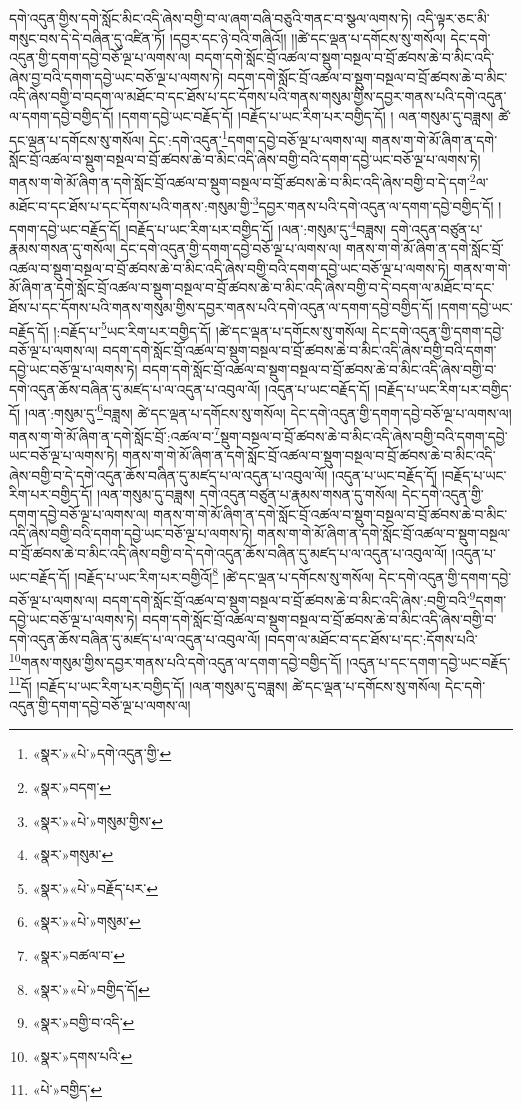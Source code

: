 དགེ་འདུན་གྱིས་དགེ་སློང་མིང་འདི་ཞེས་བགྱི་བ་ལ་ཞག་བཞི་བཅུའི་གནང་བ་སྩལ་ལགས་ཏེ། འདི་ལྟར་ཅང་མི་གསུང་བས་དེ་དེ་བཞིན་དུ་འཛིན་ཏོ། །དབྱར་དང་ཉེ་བའི་གཞིའོ།། །།ཚེ་དང་ལྡན་པ་དགོངས་སུ་གསོལ། དེང་དགེ་འདུན་གྱི་དགག་དབྱེ་བཅོ་ལྔ་པ་ལགས་ལ། བདག་དགེ་སློང་བྲོ་འཚལ་བ་སྡུག་བསྔལ་བ་བྲོ་ཚབས་ཆེ་བ་མིང་འདི་ཞེས་བྱ་བའི་དགག་དབྱེ་ཡང་བཅོ་ལྔ་པ་ལགས་ཏེ། བདག་དགེ་སློང་བྲོ་འཚལ་བ་སྡུག་བསྔལ་བ་བྲོ་ཚབས་ཆེ་བ་མིང་འདི་ཞེས་བགྱི་བ་བདག་ལ་མཐོང་བ་དང་ཐོས་པ་དང་དོགས་པའི་གནས་གསུམ་གྱིས་དབྱར་གནས་པའི་དགེ་འདུན་ལ་དགག་དབྱེ་བགྱིད་དོ། །དགག་དབྱེ་ཡང་བརྗོད་དོ། །བརྗོད་པ་ཡང་རིག་པར་བགྱིད་དོ། །
ལན་གསུམ་དུ་བཟླས། ཚེ་དང་ལྡན་པ་དགོངས་སུ་གསོལ། དེང་:དགེ་འདུན་\footnote{«སྣར་»«པེ་»དགེ་འདུན་གྱི་}དགག་དབྱེ་བཅོ་ལྔ་པ་ལགས་ལ། གནས་ག་གེ་མོ་ཞིག་ན་དགེ་སློང་བྲོ་འཚལ་བ་སྡུག་བསྔལ་བ་བྲོ་ཚབས་ཆེ་བ་མིང་འདི་ཞེས་བགྱི་བའི་དགག་དབྱེ་ཡང་བཅོ་ལྔ་པ་ལགས་ཏེ། གནས་ག་གེ་མོ་ཞིག་ན་དགེ་སློང་བྲོ་འཚལ་བ་སྡུག་བསྔལ་བ་བྲོ་ཚབས་ཆེ་བ་མིང་འདི་ཞེས་བགྱི་བ་དེ་དག་\footnote{«སྣར་»བདག་}ལ་མཐོང་བ་དང་ཐོས་པ་དང་དོགས་པའི་གནས་:གསུམ་གྱི་\footnote{«སྣར་»«པེ་»གསུམ་གྱིས་}དབྱར་གནས་པའི་དགེ་འདུན་ལ་དགག་དབྱེ་བགྱིད་དོ། །དགག་དབྱེ་ཡང་བརྗོད་དོ། །བརྗོད་པ་ཡང་རིག་པར་བགྱིད་དོ། །ལན་:གསུམ་དུ་\footnote{«སྣར་»གསུམ་}བཟླས། དགེ་འདུན་བཙུན་པ་རྣམས་གསན་དུ་གསོལ། དེང་དགེ་འདུན་གྱི་དགག་དབྱེ་བཅོ་ལྔ་པ་ལགས་ལ། གནས་ག་གེ་མོ་ཞིག་ན་དགེ་སློང་བྲོ་འཚལ་བ་སྡུག་བསྔལ་བ་བྲོ་ཚབས་ཆེ་བ་མིང་འདི་ཞེས་བགྱི་བའི་དགག་དབྱེ་ཡང་བཅོ་ལྔ་པ་ལགས་ཏེ། གནས་ག་གེ་མོ་ཞིག་ན་དགེ་སློང་བྲོ་འཚལ་བ་སྡུག་བསྔལ་བ་བྲོ་ཚབས་ཆེ་བ་མིང་འདི་ཞེས་བགྱི་བ་དེ་བདག་ལ་མཐོང་བ་དང་ཐོས་པ་དང་དོགས་པའི་གནས་གསུམ་གྱིས་དབྱར་གནས་པའི་དགེ་འདུན་ལ་དགག་དབྱེ་བགྱིད་དོ། །དགག་དབྱེ་ཡང་བརྗོད་དོ། །:བརྗོད་པ་\footnote{«སྣར་»«པེ་»བརྗོད་པར་}ཡང་རིག་པར་བགྱིད་དོ། །ཚེ་དང་ལྡན་པ་དགོངས་སུ་གསོལ། དེང་དགེ་འདུན་གྱི་དགག་དབྱེ་བཅོ་ལྔ་པ་ལགས་ལ། བདག་དགེ་སློང་བྲོ་འཚལ་བ་སྡུག་བསྔལ་བ་བྲོ་ཚབས་ཆེ་བ་མིང་འདི་ཞེས་བགྱི་བའི་དགག་དབྱེ་ཡང་བཅོ་ལྔ་པ་ལགས་ཏེ། བདག་དགེ་སློང་བྲོ་འཚལ་བ་སྡུག་བསྔལ་བ་བྲོ་ཚབས་ཆེ་བ་མིང་འདི་ཞེས་བགྱི་བ་དགེ་འདུན་ཆོས་བཞིན་དུ་མཛད་པ་ལ་འདུན་པ་འབུལ་ལོ། །འདུན་པ་ཡང་བརྗོད་དོ། །བརྗོད་པ་ཡང་རིག་པར་བགྱིད་དོ། །ལན་:གསུམ་དུ་\footnote{«སྣར་»«པེ་»གསུམ་}བཟླས། ཚེ་དང་ལྡན་པ་དགོངས་སུ་གསོལ། དེང་དགེ་འདུན་གྱི་དགག་དབྱེ་བཅོ་ལྔ་པ་ལགས་ལ། གནས་ག་གེ་མོ་ཞིག་ན་དགེ་སློང་བྲོ་:འཚལ་བ་\footnote{«སྣར་»བཚལ་བ་}སྡུག་བསྔལ་བ་བྲོ་ཚབས་ཆེ་བ་མིང་འདི་ཞེས་བགྱི་བའི་དགག་དབྱེ་ཡང་བཅོ་ལྔ་པ་ལགས་ཏེ། གནས་ག་གེ་མོ་ཞིག་ན་དགེ་སློང་བྲོ་འཚལ་བ་སྡུག་བསྔལ་བ་བྲོ་ཚབས་ཆེ་བ་མིང་འདི་ཞེས་བགྱི་བ་དེ་དགེ་འདུན་ཆོས་བཞིན་དུ་མཛད་པ་ལ་འདུན་པ་འབུལ་ལོ། །འདུན་པ་ཡང་བརྗོད་དོ། །བརྗོད་པ་ཡང་རིག་པར་བགྱིད་དོ། །ལན་གསུམ་དུ་བཟླས། དགེ་འདུན་བཙུན་པ་རྣམས་གསན་དུ་གསོལ། དེང་དགེ་འདུན་གྱི་དགག་དབྱེ་བཅོ་ལྔ་པ་ལགས་ལ། གནས་ག་གེ་མོ་ཞིག་ན་དགེ་སློང་བྲོ་འཚལ་བ་སྡུག་བསྔལ་བ་བྲོ་ཚབས་ཆེ་བ་མིང་འདི་ཞེས་བགྱི་བའི་དགག་དབྱེ་ཡང་བཅོ་ལྔ་པ་ལགས་ཏེ། གནས་ག་གེ་མོ་ཞིག་ན་དགེ་སློང་བྲོ་འཚལ་བ་སྡུག་བསྔལ་བ་བྲོ་ཚབས་ཆེ་བ་མིང་འདི་ཞེས་བགྱི་བ་དེ་དགེ་འདུན་ཆོས་བཞིན་དུ་མཛད་པ་ལ་འདུན་པ་འབུལ་ལོ། །འདུན་པ་ཡང་བརྗོད་དོ། །བརྗོད་པ་ཡང་རིག་པར་བགྱིའོ།\footnote{«སྣར་»«པེ་»བགྱིད་དོ།} །ཚེ་དང་ལྡན་པ་དགོངས་སུ་གསོལ། དེང་དགེ་འདུན་གྱི་དགག་དབྱེ་བཅོ་ལྔ་པ་ལགས་ལ། བདག་དགེ་སློང་བྲོ་འཚལ་བ་སྡུག་བསྔལ་བ་བྲོ་ཚབས་ཆེ་བ་མིང་འདི་ཞེས་:བགྱི་བའི་\footnote{«སྣར་»བགྱི་བ་འདི་}དགག་དབྱེ་ཡང་བཅོ་ལྔ་པ་ལགས་ཏེ། བདག་དགེ་སློང་བྲོ་འཚལ་བ་སྡུག་བསྔལ་བ་བྲོ་ཚབས་ཆེ་བ་མིང་འདི་ཞེས་བགྱི་བ་དགེ་འདུན་ཆོས་བཞིན་དུ་མཛད་པ་ལ་འདུན་པ་འབུལ་ལོ། །བདག་ལ་མཐོང་བ་དང་ཐོས་པ་དང་:དོགས་པའི་\footnote{«སྣར་»དགས་པའི་}གནས་གསུམ་གྱིས་དབྱར་གནས་པའི་དགེ་འདུན་ལ་དགག་དབྱེ་བགྱིད་དོ། །འདུན་པ་དང་དགག་དབྱེ་ཡང་བརྗོད་\footnote{«པེ་»བགྱིད་}དོ། །བརྗོད་པ་ཡང་རིག་པར་བགྱིད་དོ། །ལན་གསུམ་དུ་བཟླས། ཚེ་དང་ལྡན་པ་དགོངས་སུ་གསོལ། དེང་དགེ་འདུན་གྱི་དགག་དབྱེ་བཅོ་ལྔ་པ་ལགས་ལ། 